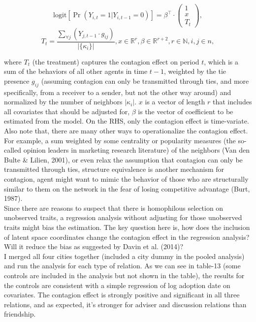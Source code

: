 \documentclass[11pt]{article}
\begin{document}
$$\text{logit}[\Pr(Y_{i,t}=1|Y_{i,t-1}=0)] = \beta^\intercal \cdot
\begin{pmatrix} 1\\x\\T_{t} \end{pmatrix}, $$
$$T_{t}=\frac{\sum_{\forall j} (Y_{j,t-1}\cdot g_{ij})}{|\{\kappa_i\}|}, x \in \mathbb{R}^r, \beta \in \mathbb{R}^{r+2}, r \in \mathbb{N}, i, j \in n,$$

where $T_t$ (the treatment) captures the contagion effect on period $t$, which is a sum of the behaviors of all other agents in time $t-1$, weighted by the tie presence $g_{ij}$ (assuming contagion can only be transmitted through ties, and more specifically, from a receiver to a sender, but not the other way around) and normalized by the number of neighbors $|\kappa_i|$. $x$ is a vector of length $r$ that includes all covariates that should be adjusted for, $\beta$ is the vector of coefficient to be estimated from the model. On the RHS, only the contagion effect is time-variate.\\

Also note that, there are many other ways to operationalize the contagion effect. For example, a sum weighted by some centrality or popularity measures (the so-called opinion leaders in marketing research literature) of the neighbors (Van den Bulte \& Lilien, 2001), or even relax the assumption that contagion can only be transmitted through ties, structure equivalence is another mechanism for contagion, agent might want to mimic the behavior of those who are structurally similar to them on the network in the fear of losing competitive advantage (Burt, 1987). \\

Since there are reasons to suspect that there is homophilous selection on unobserved traits, a regression analysis without adjusting for those unobserved traits might bias the estimation. The key question here is, how does the inclusion of latent space coordinates change the contagion effect in the regression analysis? Will it reduce the bias as suggested by Davin et al. (2014)?\\

I merged all four cities together (included a city dummy in the pooled analysis) and run the analysis for each type of relation. As we can see in table-13 (some controls are included in the analysis but not shown in the table), the results for the controls are consistent with a simple regression of log adoption date on covariates. The contagion effect is strongly positive and significant in all three relations, and as expected, it's stronger for adviser and discussion relations than friendship.\\
\end{document}
